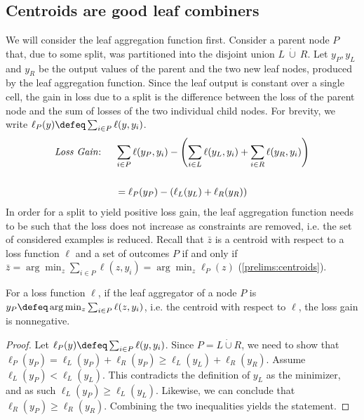 \documentclass[../main.tex]{subfiles}
\begin{document}
\subsection{Centroids are good leaf combiners} 


We will consider the leaf aggregation function first. Consider a parent node $P$ that, due to some split, was partitioned into the disjoint union $L~\dot{\cup}~R$.
Let $y_{P}, y_{L}$ and $y_{R}$ be the output values of the parent and the two new leaf nodes, produced by the leaf aggregation function. Since the leaf output is constant over a single cell, the gain in loss due to a split is the difference between the loss of the parent node and the sum of losses of the two individual child nodes.
For brevity, we write $\ell_{P}(y) \defeq \sum_{i \in P} \ell(y, y_{i})$.
\begin{align*}
\text{\textit{Loss Gain}: } \hspace{1em} &
\sum_{i \in P} \ell(y_{P}, y_{i}) - \left(  \sum_{i \in L} \ell(y_{L}, y_{i}) + \sum_{i \in R} \ell(y_{R}, y_{i}) \right) \\[1.5em]
&= \ell_P(y_P) - \left(\ell_L(y_L) + \ell_R(y_R) \right)
\end{align*}
In order for a split to yield positive loss gain, the leaf aggregation function needs to be such that the loss does not increase as constraints are removed, i.e. the set of considered examples is reduced. Recall that $\bar{z}$ is a centroid with respect to a loss function $\ell$ and a set of outcomes $P$ if and only if $\bar{z} = \arg\min_{z} \sum_{i \in P} \ell(z, y_{i}) = \arg\min_z \ell_P(z)$ (\ref{prelims:centroids}).
\begin{lemma}
\label{lemma:loss-gain-nonnegative}
For a loss function $\ell$, if the leaf aggregator of a node $P$ is $y_{P} \defeq \arg\min_{z} \sum_{i \in P} \ell(z, y_{i})$, i.e. the centroid with respect to $\ell$, the loss gain is nonnegative.
\end{lemma}
\begin{proof}
Let $\ell_{P}(y) \defeq \sum_{i \in P} \ell(y, y_{i})$. Since $P = L \dot{\cup}R$, we need to show that $\ell_{P}(y_{P}) = \ell_{L}(y_{P}) + \ell_{R}(y_{P}) \geq \ell_{L}(y_{L}) + \ell_{R}(y_{R})$. Assume $\ell_{L}(y_{P}) < \ell_{L}(y_{L})$. This contradicts the definition of $y_{L}$ as the minimizer, and as such $\ell_{L}(y_{P}) \geq \ell_{L}(y_{L})$. Likewise, we can conclude that $\ell_{R}(y_{P}) \geq \ell_{R}(y_{R})$. Combining the two inequalities yields the statement.
\end{proof}
\end{document}
